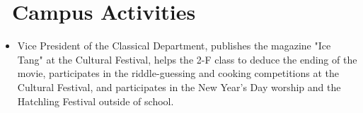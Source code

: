 \documentclass{resume}
\begin{document}
\section{\faInfo\ Campus Activities}
\begin{itemize}[parsep=0.5ex]
  \item Vice President of the Classical Department, publishes the magazine "Ice Tang" at the Cultural Festival, helps the 2-F class to deduce the ending of the movie, participates in the riddle-guessing and cooking competitions at the Cultural Festival, and participates in the New Year's Day worship and the Hatchling Festival outside of school.
\end{itemize}
\end{document}
